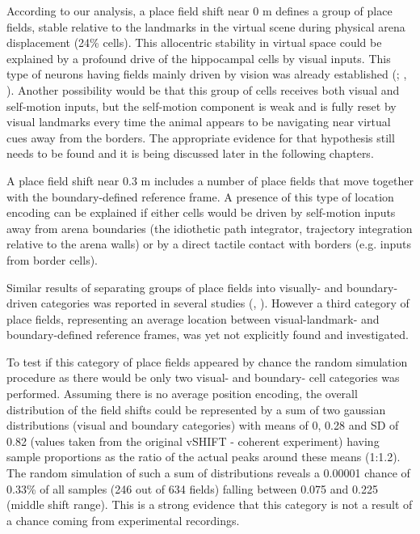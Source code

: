According to our analysis, a place field shift near 0 m defines a group of place fields, stable relative to the landmarks in the virtual scene during physical arena displacement (24\% cells). This allocentric stability in virtual space could be explained by a profound drive of the hippocampal cells by visual inputs. This type of neurons having fields mainly driven by vision was already established (\cite{Muller1987}; \cite{Chen2013}, \cite{Haas2019}). Another possibility would be that this group of cells receives both visual and self-motion inputs, but the self-motion component is weak and is fully reset by visual landmarks every time the animal appears to be navigating near virtual cues away from the borders. The appropriate evidence for that hypothesis still needs to be found and it is being discussed later in the following chapters.

A place field shift near 0.3 m includes a number of place fields that move together with the boundary-defined reference frame. A presence of this type of location encoding can be explained if either cells would be driven by self-motion inputs away from arena boundaries (the idiothetic path integrator, trajectory integration relative to the arena walls) or by a direct tactile contact with borders (e.g. inputs from border cells).

Similar results of separating groups of place fields into visually- and boundary-driven categories was reported in several studies (\cite{Chen2013}, \cite{Haas2019}). However a third category of place fields, representing an average location between visual-landmark- and boundary-defined reference frames, was yet not explicitly found and investigated.

To test if this category of place fields appeared by chance the random simulation procedure as there would be only two visual- and boundary- cell categories was performed. Assuming there is no average position encoding, the overall distribution of the field shifts could be represented by a sum of two gaussian distributions (visual and boundary categories) with means of 0, 0.28 and SD of 0.82 (values taken from the original vSHIFT - coherent experiment) having sample proportions as the ratio of the actual peaks around these means (1:1.2). The random simulation of such a sum of distributions reveals a 0.00001 chance of 0.33\% of all samples (246 out of 634 fields) falling between 0.075 and 0.225 (middle shift range). This is a strong evidence that this category is not a result of a chance coming from experimental recordings.


